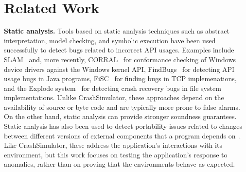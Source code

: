 \section{Related Work} \label{sec:related}

\iffalse
While there is a vast literature on test
generation~\cite{ammann2008introduction, mcminn2004search,
  puasuareanu2009survey, dias2007survey}, much less work
has focused on issues of portability and testing whether software
behaves consistently in different environments.  Prior work on
CheckAPI~\cite{rasley2015detecting} and
NetCheck~\cite{Zhuang_NSDI_2014} begins to fill this gap and this paper
builds upon those results.
%
%


Crash reproduction by test case mutation~\cite{DBLP:conf/sigsoft/XuanXM15}.

\fi


\noindent
{\bf Static analysis. }
Tools based on static analysis techniques such as abstract
interpretation, model checking, and symbolic execution have been used
successfully to detect bugs related to incorrect API usages. Examples
include SLAM~\cite{Ball_adecade, Ball:2002:SLP:503272.503274} and,
more recently, CORRAL~\cite{DBLP:conf/sigsoft/LalQ14} for conformance
checking of Windows device drivers against the Windows kernel API,
FindBugs~\cite{DBLP:conf/oopsla/HovemeyerP04} for detecting API usage
bugs in Java programs, FiSC~\cite{Musuvathi04modelchecking} for
finding bugs in TCP implemenations, and the Explode
system~\cite{Yang:2006:ELG:1298455.1298469} for detecting crash
recovery bugs in file system implementations. Unlike CrashSimulator,
these approaches depend on the availability of source or byte code and
are typically more prone to false alarms. On the other hand, static
analysis can provide stronger soundness guarantees.  Static analysis
has also been used to detect portability issues related to changes
between different versions of external components that a program
depends on~\cite{silakov2010improving, javacompliance-www}. Like
CrashSimulator, these address the application's interactions with its
environment, but this work focuses on testing the application's
response to anomalies, rather than on proving that the environments
behave as expected.

